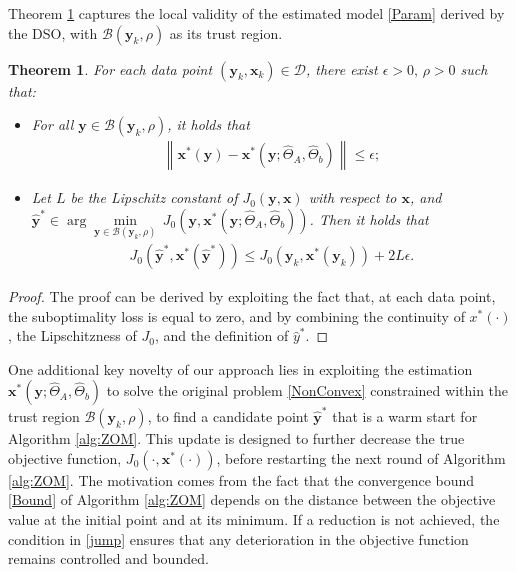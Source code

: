 \documentclass[letterpaper, 10 pt, conference]{ieeeconf}
\newcommand\xbf{\mathbf{x}}
\newcommand\ybf{\mathbf{y}}
\newtheorem{theorem}{Theorem}
\begin{document}
Theorem \ref{Surrogate} captures the local validity of the estimated model \eqref{Param} derived by the DSO, with $\mathcal{B}(\ybf_k,\rho)$ as its trust region.
\begin{theorem}\label{Surrogate}
    For each data point $(\ybf_k,\xbf_k) \in \mathcal{D}$, there exist $\epsilon>0, \, \rho >0$ such that:
    \begin{itemize}
        \item For all $\ybf \in \mathcal{B}(\ybf_k, \rho)$, it holds that \begin{align}
        \left\|\xbf^*(\ybf)-\xbf^*(\ybf; \hat{\Theta}_A, \hat{\Theta}_b)\right\|\le \epsilon;
        \end{align}
        \item Let $L$ be the Lipschitz constant of $J_0(\ybf,\xbf)$ with respect to $\xbf$, and $\hat{\ybf}^* \in \arg \min\limits_{\ybf \in \mathcal{B}(\ybf_k, \rho)}\, J_0(\ybf, \xbf^*(\ybf; \hat{\Theta}_A, \hat{\Theta}_b))$. Then it holds that 
        \begin{align}\label{jump}
        J_0(\hat{\ybf}^*, \xbf^*(\hat{\ybf}^*))\le J_0(\ybf_k, \xbf^*(\ybf_k))+ 2 L \epsilon.
        \end{align}
    \end{itemize}
\end{theorem}
\begin{proof}
    The proof can be derived by exploiting the fact that, at each data point, the suboptimality loss is equal to zero, and by combining the continuity of $x^*(\cdot)$, the Lipschitzness of $J_0$, and the definition of $\hat{y}^*$.
\end{proof}
One additional key novelty of our approach lies in exploiting the estimation $\xbf^*(\ybf; \hat{\Theta}_A, \hat{\Theta}_b)$ to solve the original problem \eqref{NonConvex} constrained within the trust region $\mathcal{B}(\ybf_k,\rho)$, to find a candidate point $\hat{\ybf}^*$ that is a warm start for Algorithm \ref{alg:ZOM}. This update is designed to further decrease the true objective function, $J_0(\cdot, \xbf^*(\cdot))$, before restarting the next round of Algorithm \ref{alg:ZOM}. The motivation comes from the fact that the convergence bound \eqref{Bound} of Algorithm \ref{alg:ZOM} depends on the distance between the objective value at the initial point and at its minimum. If a reduction is not achieved, the condition in \eqref{jump} ensures that any deterioration in the objective function remains controlled and bounded.
\end{document}
